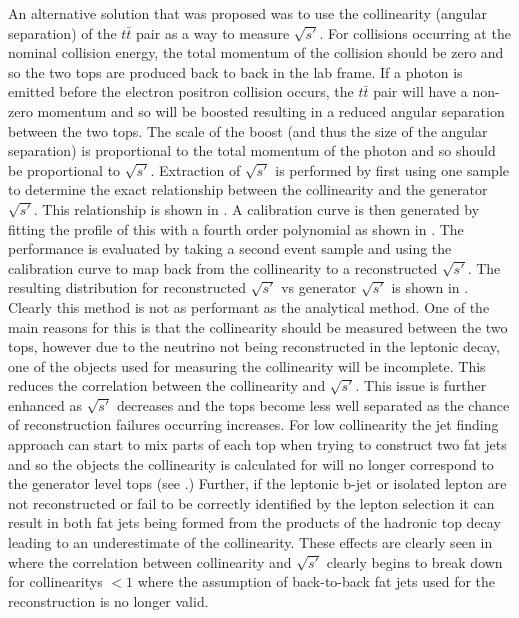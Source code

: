 An alternative solution that was proposed was to use the collinearity (angular separation) of the $t\bar{t}$ pair as a way to measure $\sqrt{s'}$. For collisions occurring at the nominal collision energy, the total momentum of the collision should be zero and so the two tops are produced back to back in the lab frame. If a photon is emitted before the electron positron collision occurs, the $t\bar{t}$ pair will have a non-zero momentum and so will be boosted resulting in a reduced angular separation between the two tops. The scale of the boost (and thus the size of the angular separation) is proportional to the total momentum of the photon and so should be proportional to $\sqrt{s'}$. Extraction of $\sqrt{s'}$ is performed by first using one sample to determine the exact relationship between the collinearity and the generator $\sqrt{s'}$. This relationship is shown in . A calibration curve is then generated by fitting the profile of this with a fourth order polynomial as shown in . The performance is evaluated by taking a second event sample and using the calibration curve to map back from the collinearity to a reconstructed $\sqrt{s'}$. The resulting distribution for reconstructed $\sqrt{s'}$ vs generator $\sqrt{s'}$ is shown in . Clearly this method is not as performant as the analytical method. One of the main reasons for this is that the collinearity should be measured between the two tops, however due to the neutrino not being reconstructed in the leptonic decay, one of the objects used for measuring the collinearity will be incomplete. This reduces the correlation between the collinearity and $\sqrt{s'}$. This issue is further enhanced as $\sqrt{s'}$ decreases and the tops become less well separated as the chance of reconstruction failures occurring increases. For low collinearity the jet finding approach can start to mix parts of each top when trying to construct two fat jets and so the objects the collinearity is calculated for will no longer correspond to the generator level tops (see .)  Further, if the leptonic b-jet or isolated lepton are not reconstructed or fail to be correctly identified by the lepton selection it can result in both fat jets being formed from the products of the hadronic top decay leading to an underestimate of the collinearity. These effects are clearly seen in  where the correlation between collinearity and $\sqrt{s'}$ clearly begins to break down for collinearitys $<1$ where the assumption of back-to-back fat jets used for the reconstruction is no longer valid.  

